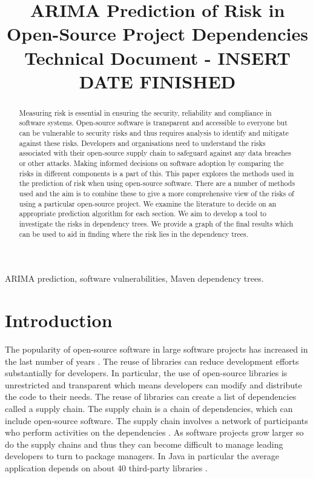 \documentclass[conference]{IEEEtran}
\begin{document}
\title{ARIMA Prediction of Risk in \\Open-Source Project Dependencies\\
{\footnotesize Technical Document - INSERT DATE FINISHED}
}

\author{
\and
{}
    }

\maketitle
\thispagestyle{plain}
\pagestyle{plain}

\begin{abstract}
Measuring risk is essential in ensuring the security, reliability and compliance in software systems. Open-source software is transparent and accessible to everyone but can be vulnerable to security risks and thus requires analysis to identify and mitigate against these risks. Developers and organisations need to understand the risks associated with their open-source supply chain to safeguard against any data breaches or other attacks. Making informed decisions on software adoption by comparing the risks in different components is a part of this. This paper explores the methods used in the prediction of risk when using open-source software. There are a number of methods used and the aim is to combine these to give a more comprehensive view of the risks of using a particular open-source project. We examine the literature to decide on an appropriate prediction algorithm for each section. We aim to develop a tool to investigate the risks in dependency trees. We provide a graph of the final results which can be used to aid in finding where the risk lies in the dependency trees. 
\end{abstract}

\begin{IEEEkeywords}
ARIMA prediction, software vulnerabilities, Maven dependency trees.
\end{IEEEkeywords}

\section{Introduction}
The popularity of open-source software in large software projects has increased in the last number of years \cite{zajdel_open_2022}. The reuse of libraries can reduce development efforts substantially for developers. In particular, the use of open-source libraries is unrestricted and transparent which means developers can modify and distribute the code to their needs. The reuse of libraries can create a list of dependencies called a supply chain. The supply chain is a chain of dependencies, which can include open-source software. The supply chain involves a network of participants who perform activities on the dependencies \cite{k_singi_trusted_2019}. As software projects grow larger so do the supply chains and thus they can become difficult to manage leading developers to turn to package managers. In Java in particular the average application depends on about 40 third-party libraries \cite{a_m_mir_effect_2023}. 
\end{document}

